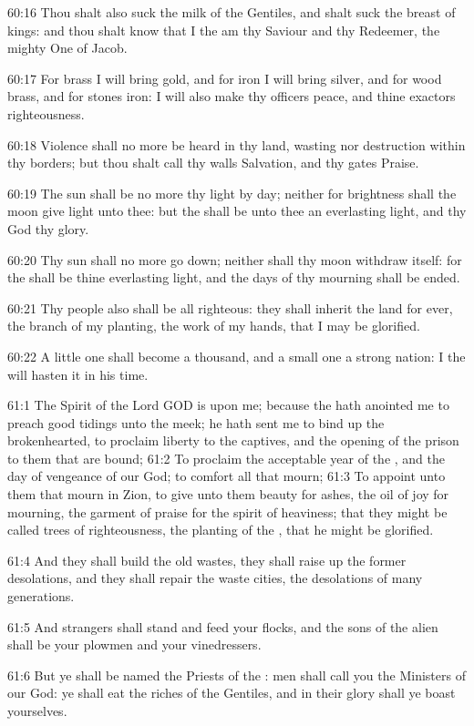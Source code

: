 60:16 Thou shalt also suck the milk of the Gentiles, and shalt suck
the breast of kings: and thou shalt know that I the \LORD am thy
Saviour and thy Redeemer, the mighty One of Jacob.

60:17 For brass I will bring gold, and for iron I will bring silver,
and for wood brass, and for stones iron: I will also make thy officers
peace, and thine exactors righteousness.

60:18 Violence shall no more be heard in thy land, wasting nor
destruction within thy borders; but thou shalt call thy walls
Salvation, and thy gates Praise.

60:19 The sun shall be no more thy light by day; neither for
brightness shall the moon give light unto thee: but the \LORD shall be
unto thee an everlasting light, and thy God thy glory.

60:20 Thy sun shall no more go down; neither shall thy moon withdraw
itself: for the \LORD shall be thine everlasting light, and the days of
thy mourning shall be ended.

60:21 Thy people also shall be all righteous: they shall inherit the
land for ever, the branch of my planting, the work of my hands, that I
may be glorified.

60:22 A little one shall become a thousand, and a small one a strong
nation: I the \LORD will hasten it in his time.

61:1 The Spirit of the Lord GOD is upon me; because the \LORD hath
anointed me to preach good tidings unto the meek; he hath sent me to
bind up the brokenhearted, to proclaim liberty to the captives, and
the opening of the prison to them that are bound; 61:2 To proclaim the
acceptable year of the \LORD, and the day of vengeance of our God; to
comfort all that mourn; 61:3 To appoint unto them that mourn in Zion,
to give unto them beauty for ashes, the oil of joy for mourning, the
garment of praise for the spirit of heaviness; that they might be
called trees of righteousness, the planting of the \LORD, that he might
be glorified.

61:4 And they shall build the old wastes, they shall raise up the
former desolations, and they shall repair the waste cities, the
desolations of many generations.

61:5 And strangers shall stand and feed your flocks, and the sons of
the alien shall be your plowmen and your vinedressers.

61:6 But ye shall be named the Priests of the \LORD: men shall call you
the Ministers of our God: ye shall eat the riches of the Gentiles, and
in their glory shall ye boast yourselves.

